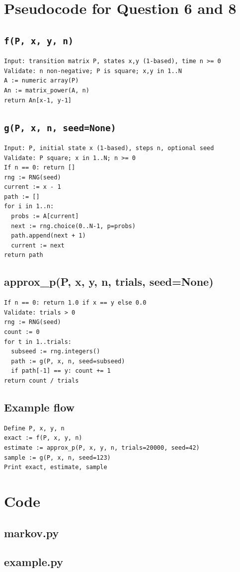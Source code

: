 \documentclass{article}
\begin{document}
\section*{Pseudocode for Question 6 and 8}
\subsection*{\texttt{f(P, x, y, n)}}
\begin{lstlisting}[basicstyle=\ttfamily\small]
Input: transition matrix P, states x,y (1-based), time n >= 0
Validate: n non-negative; P is square; x,y in 1..N
A := numeric array(P)
An := matrix_power(A, n)
return An[x-1, y-1]
\end{lstlisting}

\subsection*{\texttt{g(P, x, n, seed=None)}}
\begin{lstlisting}[basicstyle=\ttfamily\small]
Input: P, initial state x (1-based), steps n, optional seed
Validate: P square; x in 1..N; n >= 0
If n == 0: return []
rng := RNG(seed)
current := x - 1
path := []
for i in 1..n:
  probs := A[current]
  next := rng.choice(0..N-1, p=probs)
  path.append(next + 1)
  current := next
return path
\end{lstlisting}

\subsection*{approx\_p(P, x, y, n, trials, seed=None)}
\begin{lstlisting}[basicstyle=\ttfamily\small]
If n == 0: return 1.0 if x == y else 0.0
Validate: trials > 0
rng := RNG(seed)
count := 0
for t in 1..trials:
  subseed := rng.integers()
  path := g(P, x, n, seed=subseed)
  if path[-1] == y: count += 1
return count / trials
\end{lstlisting}

\subsection*{Example flow}
\begin{lstlisting}[basicstyle=\ttfamily\small]
Define P, x, y, n
exact := f(P, x, y, n)
estimate := approx_p(P, x, y, n, trials=20000, seed=42)
sample := g(P, x, n, seed=123)
Print exact, estimate, sample
\end{lstlisting}

\section*{Code}
\subsection*{markov.py}


\subsection*{example.py}

\end{document}
